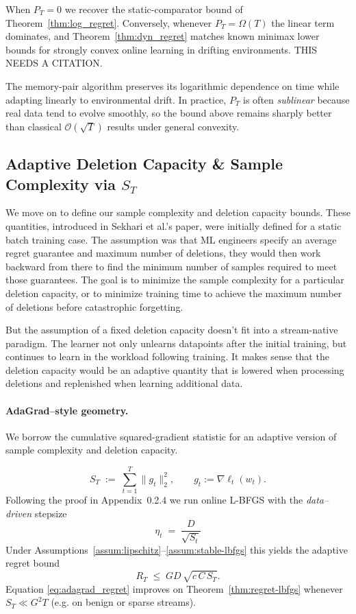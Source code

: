 \documentclass[a4paper,12pt]{article}
\begin{document}
When $P_{T}=0$ we recover the static-comparator bound of
Theorem~\ref{thm:log_regret}.  Conversely, whenever $P_{T}=\Omega(T)$ the linear term dominates, and Theorem~\ref{thm:dyn_regret} matches known minimax lower bounds for
strongly convex online learning in drifting environments. THIS NEEDS A CITATION.

The memory-pair algorithm preserves its logarithmic dependence on time while adapting linearly to environmental drift. In practice, $P_T$ is often \emph{sublinear} because real data tend to evolve smoothly, so the bound above remains sharply better than classical $\mathcal{O}(\sqrt{T})$ results under general convexity.

\subsection{Adaptive Deletion Capacity \& Sample Complexity via $S_{T}$}
\label{subsec:adaptive_capacity}

We move on to define our sample complexity and deletion capacity bounds. These quantities, introduced in Sekhari et al.'s paper, were initially defined for a static batch training case. The assumption was that ML engineers specify an average regret guarantee and maximum number of deletions, they would then work backward from there to find the minimum number of samples required to meet those guarantees. The goal is to minimize the sample complexity for a particular deletion capacity, or to minimize training time to achieve the maximum number of deletions before catastrophic forgetting.

But the assumption of a fixed deletion capacity doesn't fit into a stream-native paradigm. The learner not only unlearns datapoints after the initial training, but continues to learn in the workload following training. It makes sense that the deletion capacity would be an adaptive quantity that is lowered when processing deletions and replenished when learning additional data.

\paragraph{AdaGrad–style geometry.} We borrow the cumulative squared-gradient statistic for an adaptive version of sample complexity and deletion capacity.

$$
  S_T \;:=\;\sum_{t=1}^{T}\lVert g_t\rVert_2^{2},
\qquad
  g_t := \nabla\ell_t(w_t).
$$
Following the proof in Appendix~0.2.4 we run online L-BFGS with the
\emph{data–driven} stepsize
$$
  \eta_t \;=\;\dfrac{D}{\sqrt{S_t}}
$$
Under Assumptions~\ref{assum:lipschitz}–\ref{assum:stable-lbfgs} this yields the
adaptive regret bound
\begin{equation}
  R_T
  \;\le\;
  G D\,\sqrt{c\,C\,S_T}.
  \label{eq:adagrad_regret}
\end{equation}
Equation \eqref{eq:adagrad_regret} improves on
Theorem~\ref{thm:regret-lbfgs} whenever
\(S_T\ll G^{2}T\) (e.g. on benign or sparse streams).
\end{document}
